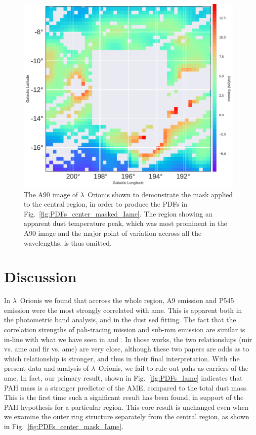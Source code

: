         \begin{figure}
          \includegraphics[width=\textwidth]{../Plots/ch_lori/lambda_orionis_center_mask.pdf}
          \centering
          \caption{ The A90 image of $\lambda$~Orionis shown to demonstrate the mask applied to the central region, in order to produce the PDFs in Fig.~\ref{fig:PDFs_center_masked_Iame}. The region showing an apparent dust temperature peak, which was most prominent in the A90 image and the major point of variation accross all the wavelengths, is thus omitted.}
          \label{fig:lambda_orionis_center_mask}
        \end{figure}

  \section{Discussion}
  \label{sec:lori_discussion}
      In  $\lambda$~Orionis we found that accross the whole region, A9 emission and P545 emission were the most strongly correlated with \acrshort{ame}. This is apparent both in the photometric band analysis, and in the dust \acrshort{sed} fitting.  The fact that the correlation strengths of \acrshort{pah}-tracing mission and sub-mm emission are similar is in-line with what we have seen in \cite{ysard10b} and \cite{hensley16}. In those works, the two relationships (\acrshort{mir} vs. \acrshort{ame} and \acrshort{fir} vs. \acrshort{ame}) are very close, although these two papers are odds as to which relationship is stronger, and thus in their final interpretation. With the present data and analysis of $\lambda$~Orionis, we fail to rule out \acrshort{pah}s as carriers of the \acrshort{ame}. In fact, our primary result, shown in Fig.~\ref{fig:PDFs_Iame} indicates that PAH mass is a stronger predictor of the AME, compared to the total dust mass. This is the first time such a significant result has been found, in support of the PAH hypothesis for a particular region. This core result is unchanged even when we examine the outer ring structure separately from the central region, as shown in Fig.~\ref{fig:PDFs_center_mask_Iame}.

